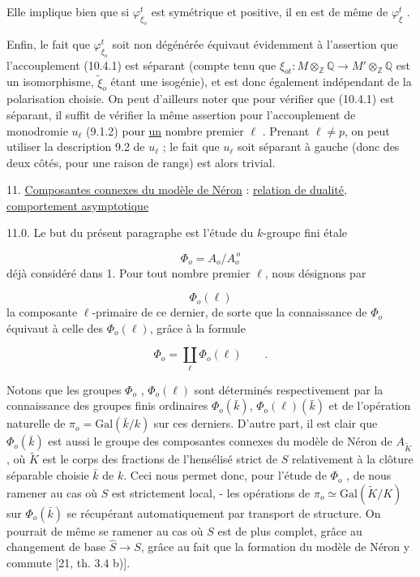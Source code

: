 
Elle implique bien que si $\varphi^t_{\xi_o}$ est symétrique et positive, il en est de même de $\varphi^t_{\xi}$ .

Enfin, le fait que $\varphi^t_{\xi_o}$ soit non dégénérée équivaut évidemment à l'assertion que l'accouplement (10.4.1) est séparant (compte tenu que $\xi_{ot} : M \otimes_{\mathbb{Z}} \mathbb{Q} \longrightarrow M' \otimes_{\mathbb{Z}} \mathbb{Q}$ est un isomorphisme, $\widetilde{\xi}_o$ étant une isogénie), et est donc également indépendant de la polarisation choisie. On peut d'ailleurs noter que pour vérifier que (10.4.1) est séparant, il suffit de vérifier la même assertion pour l'accouplement de monodromie $u_\ell$ (9.1.2) pour \underline{un} nombre premier $\ell$ . Prenant $\ell \neq p$, on peut utiliser la description 9.2 de $u_\ell$ ; le fait que $u_\ell$ soit séparant à gauche (donc des deux côtés, pour une raison de rangs) est alors trivial.


11. \underline{Composantes connexes du modèle de Néron} : \underline{relation de dualité, comportement asymptotique}

11.0.  Le but du présent paragraphe est l'étude du $k$-groupe fini étale

\begin{equation}\tag{11.0.1}
\Phi_o = A_o / A_o^{\,o}
\end{equation}
déjà considéré dans 1. Pour tout nombre premier $\ell$, nous désignons par

\begin{equation*}
\Phi_o(\ell)
\end{equation*}
la composante $\ell$-primaire de ce dernier, de sorte que la connaissance de $\Phi_o$ équivaut à celle des $\Phi_o(\ell)$, grâce à la formule

\begin{equation}\tag{11.0.2}
\Phi_o = \coprod_{\ell} \Phi_o(\ell) \qquad .
\end{equation}


Notons que les groupes $\Phi_{o}$ , $\Phi_{o}(\ell)$ sont déterminés respectivement par la connaissance des groupes finis ordinaires $\Phi_{o}(\bar{k})$, $\Phi_{o}(\ell)(\bar{k})$ et de l'opération naturelle de $\pi_{o} = \mathrm{Gal}(\bar{k}/k)$ sur ces derniers. D'autre part, il est clair que $\Phi_{o}(\bar{k})$ est aussi le groupe des composantes connexes du modèle de Néron de $A_{\widetilde{K}}$ , où $\widetilde{K}$ est le corps des fractions de l'hensélisé strict de $S$ relativement à la clôture séparable choisie $\bar{k}$ de $k$. Ceci nous permet donc, pour l'étude de $\Phi_{o}$ , de nous ramener au cas où $S$ est strictement local, - les opérations de $\pi_{o} \simeq \mathrm{Gal}(\widetilde{K}/K)$ sur $\Phi_{o}(\bar{k})$ se récupérant automatiquement par transport de structure. On pourrait de même se ramener au cas où $S$ est de plus complet, grâce au changement de base $\widehat{S} \longrightarrow S$, grâce au fait que la formation du modèle de Néron y commute [21, th. 3.4 b)].

